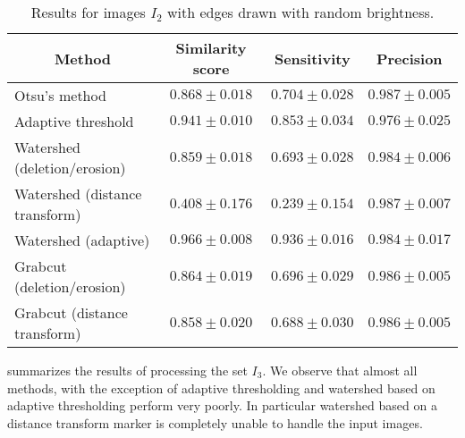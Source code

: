 		\begin{table}
			\centering
			\begin{tabular}{@{} l *3c @{}}
			\toprule
			\multicolumn{1}{c}{Method}    & Similarity score  & Sensitivity  & Precision \\ 
			\midrule
			Otsu's method                   & $0.868 \pm 0.018$ & $0.704 \pm 0.028$ & $0.987 \pm 0.005$ \\
			Adaptive threshold              & $0.941 \pm 0.010$ & $0.853 \pm 0.034$ & $0.976 \pm 0.025$ \\
			Watershed (deletion/erosion)    & $0.859 \pm 0.018$ & $0.693 \pm 0.028$ & $0.984 \pm 0.006$ \\
			Watershed (distance transform)  & $0.408 \pm 0.176$ & $0.239 \pm 0.154$ & $0.987 \pm 0.007$ \\
			Watershed (adaptive)            & $0.966 \pm 0.008$ & $0.936 \pm 0.016$ & $0.984 \pm 0.017$ \\
			Grabcut (deletion/erosion)      & $0.864 \pm 0.019$ & $0.696 \pm 0.029$ & $0.986 \pm 0.005$ \\
			Grabcut (distance transform)    & $0.858 \pm 0.020$ & $0.688 \pm 0.030$ & $0.986 \pm 0.005$ \\
			\bottomrule
			\end{tabular}
			\caption[\NEFIs evaluation - Edges with varying brightness]{Results for images $I_2$ with edges drawn with random brightness.}
			\label{tab:colored_edges}
		\end{table}

		
		 summarizes the results of processing the set $I_3$. We observe that almost all methods, with the exception of adaptive thresholding and watershed based on adaptive thresholding perform very poorly. In particular watershed based on a distance transform marker is completely unable to handle the input images.

